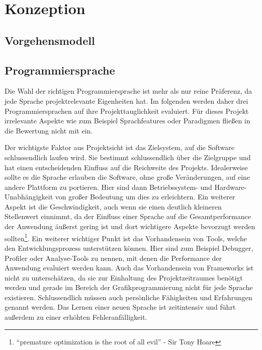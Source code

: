 \chapter{Konzeption}

\section{Vorgehensmodell}

\section{Programmiersprache}
Die Wahl der richtigen Programmiersprache ist mehr als nur reine Präferenz, da jede Sprache projektrelevante Eigenheiten hat. Im folgenden werden daher drei Programmiersprachen auf ihre Projekttauglichkeit evaluiert. Für dieses Projekt irrelevante Aspekte wie zum Beispiel Sprachfeatures oder Paradigmen fließen in die Bewertung nicht mit ein.

Der wichtigste Faktor aus Projektsicht ist das Zielsystem, auf die Software schlussendlich laufen wird. Sie bestimmt schlussendlich über die Zielgruppe und hat einen entscheidenden Einfluss auf die Reichweite des Projekts. Idealerweise sollte es die Sprache erlauben die Software, ohne große Veränderungen, auf eine andere Plattform zu portieren. Hier sind dann Betriebssystem- und Hardware-Unabhängigkeit von großer Bedeutung um dies zu erleichtern. Ein weiterer Aspekt ist die Geschwindigkeit, auch wenn sie einen deutlich kleineren Stellenwert einnimmt, da der Einfluss einer Sprache auf die Gesamtperformance der Anwendung äußerst gering ist und dort wichtigere Aspekte bevorzugt werden sollten\footnote{“premature optimization is the root of all evil” - Sir Tony Hoare}. Ein weiterer wichtiger Punkt ist das Vorhandensein von Tools, welche den Entwicklungsprozess unterstützen können. Hier sind zum Beispiel Debugger, Profiler oder Analyse-Tools zu nennen, mit denen die Performance der Anwendung evaluiert werden kann. Auch das Vorhandensein von Frameworks ist nicht zu unterschätzen, da sie zur Einhaltung des Projektzeitraumes benötigt werden und gerade im Bereich der Grafikprogrammierung nicht für jede Sprache existieren. Schlussendlich müssen auch persönliche Fähigkeiten und Erfahrungen genannt werden. Das Lernen einer neuen Sprache ist zeitintensiv und führt außerdem zu einer erhöhten Fehleranfälligkeit.

